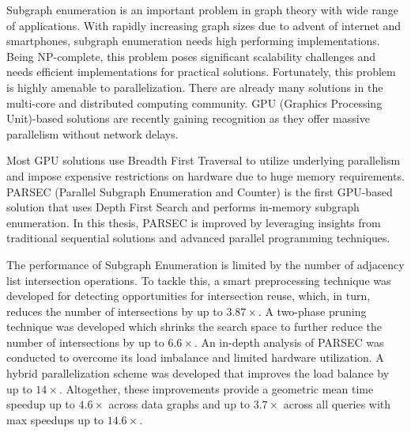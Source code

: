 Subgraph enumeration is an important problem in graph theory with wide range of applications.
With rapidly increasing graph sizes due to advent of internet and smartphones, subgraph enumeration needs high performing implementations.
Being NP-complete, this problem poses significant scalability challenges and needs efficient implementations for practical solutions.
Fortunately, this problem is highly amenable to parallelization.
There are already many solutions in the multi-core and distributed computing community.
GPU (Graphics Processing Unit)-based solutions are recently gaining recognition as they offer massive parallelism without network delays.

Most GPU solutions use Breadth First Traversal to utilize underlying parallelism and impose expensive restrictions on hardware due to huge memory requirements.
PARSEC (Parallel Subgraph Enumeration and Counter) \cite{PARSEC_VD} is the first GPU-based solution that uses Depth First Search and performs in-memory subgraph enumeration.
In this thesis, PARSEC is improved by leveraging insights from traditional sequential solutions and advanced parallel programming techniques.

The performance of Subgraph Enumeration is limited by the number of adjacency list intersection operations.
To tackle this, a smart preprocessing technique was developed for detecting opportunities for intersection reuse, which, in turn, reduces the number of intersections by up to $3.87\times$.
A two-phase pruning technique was developed which shrinks the search space to further reduce the number of intersections by up to $6.6\times$.
An in-depth analysis of PARSEC was conducted to overcome its load imbalance and limited hardware utilization. A hybrid parallelization scheme was developed that improves the load balance by up to $14\times$.
Altogether, these improvements provide a geometric mean time speedup up to $4.6\times$ across data graphs and up to $3.7\times$ across all queries with max speedups up to $14.6\times$.
